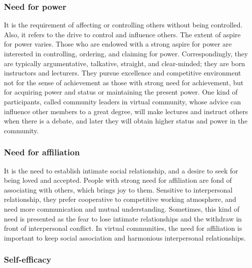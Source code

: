 \documentclass{elsarticle}
\begin{document}
\subsubsection{ Need for power}
\label{sec:need-power}

It is the requirement of affecting or controlling
others without being controlled. Also, it refers to the drive to
control and influence others. The extent of aspire for power
varies. Those who are endowed with a strong aspire for power are
interested in controlling, ordering, and claiming for
power. Correspondingly, they are typically argumentative, talkative,
straight, and clear-minded; they are born instructors and
lecturers. They pursue excellence and competitive environment not for
the sense of achievement as those with strong need for achievement,
but for acquiring power and status or maintaining the present
power. One kind of participants, called community leaders in virtual
community, whose advice can influence other members to a great degree,
will make lectures and instruct others when there is a debate, and
later they will obtain higher status and power in the community. 

\subsubsection{ Need for affiliation}
\label{sec:need-affiliation}

It is the need to establish intimate social
relationship, and a desire to seek for being loved and
accepted. People with strong need for affiliation are fond of
associating with others, which brings joy to them. Sensitive to
interpersonal relationship, they prefer cooperative to competitive
working atmosphere, and need more communication and mutual
understanding. Sometimes, this kind of need is presented as the fear
to lose intimate relationships and the withdraw in front of
interpersonal conflict. In virtual communities, the need for
affiliation is important to keep social association and harmonious
interpersonal relationships.

\subsubsection{Self-efficacy}
\label{sec:self-efficacy}
\end{document}
